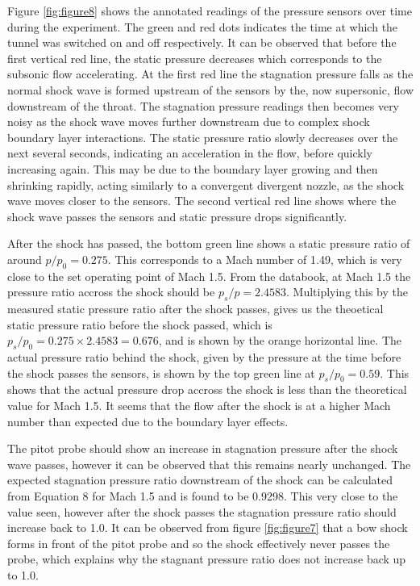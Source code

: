 \documentclass{article}
\begin{document}
Figure \ref{fig:figure8} shows the annotated readings of the pressure sensors over time during the experiment.
The green and red dots indicates the time at which the tunnel was switched on and off respectively.
It can be observed that before the first vertical red line, the static pressure decreases which corresponds to the subsonic flow accelerating.
At the first red line the stagnation pressure falls as the normal shock wave is formed upstream of the sensors by the, now supersonic, flow downstream of the throat.
The stagnation pressure readings then becomes very noisy as the shock wave moves further downstream due to complex shock boundary layer interactions.
The static pressure ratio slowly decreases over the next several seconds, indicating an acceleration in the flow, before quickly increasing again.
This may be due to the boundary layer growing and then shrinking rapidly, acting similarly to a convergent divergent nozzle, as the shock wave moves closer to the sensors.
The second vertical red line shows where the shock wave passes the sensors and static pressure drops significantly.

After the shock has passed, the bottom green line shows a static pressure ratio of around $p/p_0 = 0.275$. This corresponds to a Mach number of 1.49, which is very close to the set operating point of Mach 1.5.
From the databook, at Mach 1.5 the pressure ratio accross the shock should be $p_s/p = 2.4583$.
Multiplying this by the measured static pressure ratio after the shock passes, gives us the theoetical static pressure ratio before the shock passed, which is $p_s/p_0 = 0.275 \times 2.4583 = 0.676$, and is shown by the orange horizontal line.
The actual pressure ratio behind the shock, given by the pressure at the time before the shock passes the sensors, is shown by the top green line at $p_s/p_0 = 0.59$.
This shows that the actual pressure drop accross the shock is less than the theoretical value for Mach 1.5.
It seems that the flow after the shock is at a higher Mach number than expected due to the boundary layer effects.

The pitot probe should show an increase in stagnation pressure after the shock wave passes, however it can be observed that this remains nearly unchanged.
The expected stagnation pressure ratio downstream of the shock can be calculated from Equation 8 for Mach 1.5 and is found to be 0.9298. This very close to the value seen, however after the shock passes the stagnation pressure ratio should increase back to 1.0.
It can be observed from figure \ref{fig:figure7} that a bow shock forms in front of the pitot probe and so the shock effectively never passes the probe, which explains why the stagnant pressure ratio does not increase back up to 1.0.
\end{document}
